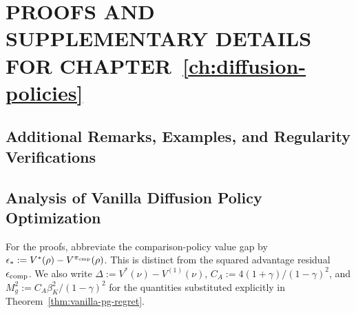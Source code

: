 \chapter{PROOFS AND SUPPLEMENTARY DETAILS FOR CHAPTER~\ref{ch:diffusion-policies}}
\label{app:diffusion-policies}


\section{Additional Remarks, Examples, and Regularity Verifications}
\label{app:tables}
\label{tab:value}
\label{tab:normalized-regret}
\label{tab:regret-exponent}
\label{tab:sublinear-regret}
\label{tab:rate-tests}
\label{tab:actor-counts}
\label{tab:actor-loss}
\label{app:remarks}
\label{app:representation}
\label{prop:gaussian-bc-example}
\label{eq:bc-demo-value}
\label{eq:bc-gaussian-value}
\label{prop:flat-gmm-separation}
\label{eq:product-mixture-spatial-score}
\label{prop:learned-product-mixture}
\label{app:finite-state-coverage}
\label{alg:dppo-sampler}
\label{app:hybrid}
\label{defn:spc}
\label{app:lipschitz}
\label{app:nonconservative-score}
\label{lem:ddpm-ddim-log-policy-densities}
\label{lem:lipschitz-constant-policy}
\label{eq:lipschitz-gradient-recursion-1}
\label{eq:lipschitz-norm-recursion-2}
\label{eq:lipschitz-unrolled-recursion-3}
\label{eq:lipschitz-jacobian-4}
\label{eq:lipschitz-jacobian-bound-5}
\label{eq:lipschitz-change-of-variables-6}
\label{eq:lipschitz-derivative-log-policy-7}
\label{app:practical-network-regularity}
\label{eq:network-polynomial-derivatives}
\label{prop:practical-network-regularity}
\label{eq:network-score-growth}
\label{eq:conditioned-gaussian-moment}
\label{app:adapter-fisher}


\section{Analysis of Vanilla Diffusion Policy Optimization}
\label{app:vanilla-pg}
For the proofs, abbreviate the comparison-policy value gap by $\epsilon_*:=V^*(\rho)-V^{\pi_{\rm cmp}}(\rho)$. This is distinct from the squared advantage residual $\epsilon_{\rm comp}$. We also write $\Delta:=V^*(\nu)-V^{(1)}(\nu)$, $C_A:=4(1+\gamma)/(1-\gamma)^2$, and $M_g^2:=C_A\beta_K^2/(1-\gamma)^2$ for the quantities substituted explicitly in Theorem~\ref{thm:vanilla-pg-regret}.


